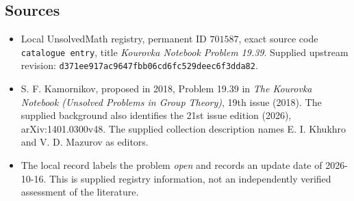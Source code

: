 \documentclass[11pt]{article}
\begin{document}
\subsection{Sources}
\begin{itemize}
\item Local UnsolvedMath registry, permanent ID \(701587\), exact source code \texttt{catalogue entry}, title \emph{Kourovka Notebook Problem 19.39}. Supplied upstream revision: \texttt{d371ee917ac9647fbb06cd6fc529deec6f3dda82}.
\item S. F. Kamornikov, proposed in 2018, Problem 19.39 in \emph{The Kourovka Notebook (Unsolved Problems in Group Theory)}, 19th issue (2018). The supplied background also identifies the 21st issue edition (2026), arXiv:1401.0300v48. The supplied collection description names E. I. Khukhro and V. D. Mazurov as editors.
\item The local record labels the problem \emph{open} and records an update date of 2026-10-16. This is supplied registry information, not an independently verified assessment of the literature.
\end{itemize}
\end{document}
